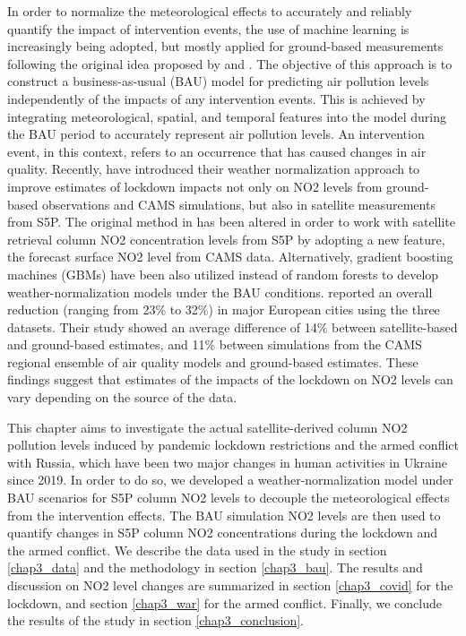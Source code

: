 In order to normalize the meteorological effects to accurately and reliably quantify the impact of intervention events, the use of machine learning is increasingly being adopted, but mostly applied for ground-based measurements following the original idea proposed by \citep{grange2018random} and \citep{grange2019using}. The objective of this approach is to construct a business-as-usual (BAU) model for predicting air pollution levels independently of the impacts of any intervention events. This is achieved by integrating meteorological, spatial, and temporal features into the model during the BAU period to accurately represent air pollution levels. An intervention event, in this context, refers to an occurrence that has caused changes in air quality. Recently, \citep{barre2021estimating} have introduced their weather normalization approach to improve estimates of lockdown impacts not only on NO2 levels from ground-based observations and CAMS simulations, but also in satellite measurements from S5P. The original method in \citep{grange2018random,grange2019using} has been altered in order to work with satellite retrieval column NO2 concentration levels from S5P by adopting a new feature, the forecast surface NO2 level from CAMS data. Alternatively, gradient boosting machines (GBMs) \citep{friedman2001greedy} have been also utilized instead of random forests \citep{grange2018random} to develop weather-normalization models under the BAU conditions. \citep{barre2021estimating} reported an overall reduction (ranging from 23\% to 32\%) in major European cities using the three datasets. Their study showed an average difference of 14\% between satellite-based and ground-based estimates, and 11\% between simulations from the CAMS regional ensemble of air quality models and ground-based estimates. These findings suggest that estimates of the impacts of the lockdown on NO2 levels can vary depending on the source of the data.\par
This chapter aims to investigate the actual satellite-derived column NO2 pollution levels induced by pandemic lockdown restrictions and the armed conflict with Russia, which have been two major changes in human activities in Ukraine since 2019. In order to do so, we developed a weather-normalization model under BAU scenarios for S5P column NO2 levels to decouple the meteorological effects from the intervention effects. The BAU simulation NO2 levels are then used to quantify changes in S5P column NO2 concentrations during the lockdown and the armed conflict. We describe the data used in the study in section \ref{chap3_data} and the methodology in section \ref{chap3_bau}. The results and discussion on NO2 level changes are summarized in section \ref{chap3_covid} for the lockdown, and section \ref{chap3_war} for the armed conflict. Finally, we conclude the results of the study in section \ref{chap3_conclusion}.\par
